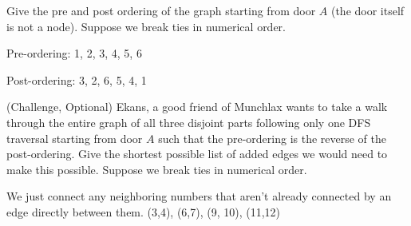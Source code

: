 
\question Give the pre and post ordering of the graph starting from door $A$ (the door itself is not a node). Suppose we break ties in numerical order. 

\begin{solution}
Pre-ordering: 1, 2, 3, 4, 5, 6

Post-ordering: 3, 2, 6, 5, 4, 1
\end{solution}

\vspace{30mm}

\question (Challenge, Optional) Ekans, a good friend of Munchlax wants to take a walk through the entire graph of all three disjoint parts following only one DFS traversal starting from door $A$ such that the pre-ordering is the reverse of the post-ordering. Give the shortest possible list of added edges we would need to make this possible. Suppose we break ties in numerical order. 

\begin{solution}
We just connect any neighboring numbers that aren't already connected by an edge directly between them. 
(3,4), (6,7), (9, 10), (11,12)
\end{solution}